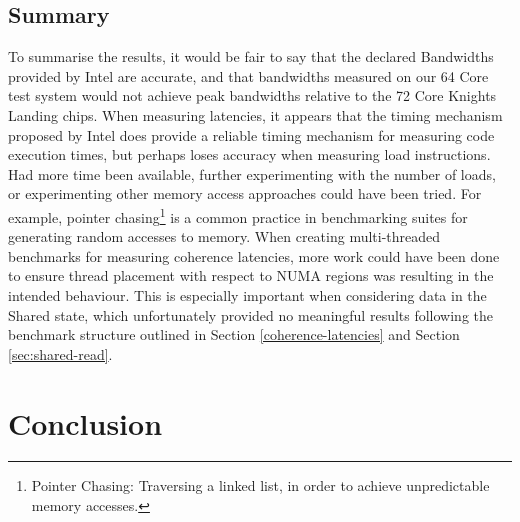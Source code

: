 \documentclass[bsc,frontabs,twoside,singlespacing,parskip,deptreport]{infthesis}     %
\begin{document}
\section{Summary}
To summarise the results, it would be fair to say that the declared Bandwidths provided by Intel are accurate, and that bandwidths measured on our 64 Core test system would not achieve peak bandwidths relative to the 72 Core Knights Landing chips. When measuring latencies, it appears that the timing mechanism proposed by Intel\cite{code_exec_times} does provide a reliable timing mechanism for measuring code execution times, but perhaps loses accuracy when measuring load instructions. Had more time been available, further experimenting with the number of loads, or experimenting other memory access approaches could have been tried. For example, pointer chasing\footnote{Pointer Chasing: Traversing a linked list, in order to achieve unpredictable memory accesses.} is a common practice in benchmarking suites for generating random accesses to memory. When creating multi-threaded benchmarks for measuring coherence latencies, more work could have been done to ensure thread placement with respect to NUMA regions was resulting in the intended behaviour. This is especially important when considering data in the Shared state, which unfortunately provided no meaningful results following the benchmark structure outlined in Section \ref{coherence-latencies} and Section \ref{sec:shared-read}.

\chapter{Conclusion}\label{chap:conclusion}
\end{document}
